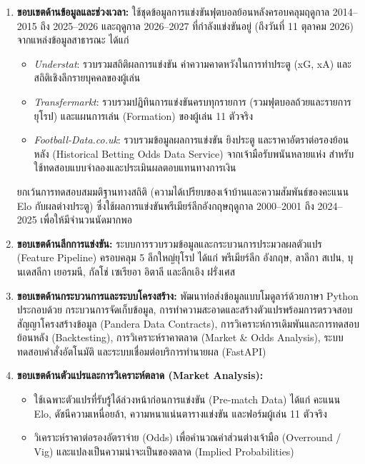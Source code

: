 \begin{enumerate}[label=\arabic*)]
    \item \textbf{ขอบเขตด้านข้อมูลและช่วงเวลา:} ใช้ชุดข้อมูลการแข่งขันฟุตบอลย้อนหลังครอบคลุมฤดูกาล 2014--2015 ถึง 2025--2026 และฤดูกาล 2026--2027 ที่กำลังแข่งขันอยู่ (ถึงวันที่ 11 ตุลาคม 2026) จากแหล่งข้อมูลสาธารณะ ได้แก่
    \begin{itemize}[labelindent=0pt]
        \item \textit{Understat}: รวบรวมสถิติผลการแข่งขัน ค่าความคาดหวังในการทำประตู (xG, xA) และสถิติเชิงลึกรายบุคคลของผู้เล่น \cite{understat2024}
        \item \textit{Transfermarkt}: รวบรวมปฏิทินการแข่งขันครบทุกรายการ (รวมฟุตบอลถ้วยและรายการยุโรป) และแผนการเล่น (Formation) ของผู้เล่น 11 ตัวจริง \cite{transfermarkt2024}
        \item \textit{Football-Data.co.uk}: รวบรวมข้อมูลผลการแข่งขัน ยิงประตู และราคาอัตราต่อรองย้อนหลัง (Historical Betting Odds Data Service) จากเจ้ามือรับพนันหลายแห่ง สำหรับใช้ทดสอบแบบจำลองและประเมินผลตอบแทนทางการเงิน
    \end{itemize}
    ยกเว้นการทดสอบสมมติฐานทางสถิติ (ความได้เปรียบของเจ้าบ้านและความสัมพันธ์ของคะแนน Elo กับผลต่างประตู) ซึ่งใช้ผลการแข่งขันพรีเมียร์ลีกอังกฤษฤดูกาล 2000--2001 ถึง 2024--2025 เพื่อให้มีจำนวนนัดมากพอ

    \item \textbf{ขอบเขตด้านลีกการแข่งขัน:} ระบบการรวบรวมข้อมูลและกระบวนการประมวลผลตัวแปร (Feature Pipeline) ครอบคลุม 5 ลีกใหญ่ยุโรป ได้แก่ พรีเมียร์ลีก อังกฤษ, ลาลีกา สเปน, บุนเดสลีกา เยอรมนี, กัลโช่ เซเรียอา อิตาลี และลีกเอิง ฝรั่งเศส

    \item \textbf{ขอบเขตด้านกระบวนการและระบบโครงสร้าง:} พัฒนาท่อส่งข้อมูลแบบโมดูลาร์ด้วยภาษา Python ประกอบด้วย กระบวนการจัดเก็บข้อมูล, การทำความสะอาดและสร้างตัวแปรพร้อมการตรวจสอบสัญญาโครงสร้างข้อมูล (Pandera Data Contracts), การวิเคราะห์การเดิมพันและการทดสอบย้อนหลัง (Backtesting), การวิเคราะห์ราคาตลาด (Market \& Odds Analysis), ระบบทดสอบคำสั่งอัตโนมัติ และระบบเชื่อมต่อบริการทำนายผล (FastAPI)

    \item \textbf{ขอบเขตด้านตัวแปรและการวิเคราะห์ตลาด (Market Analysis):}
    \begin{itemize}[labelindent=0pt]
        \item ใช้เฉพาะตัวแปรที่รับรู้ได้ล่วงหน้าก่อนการแข่งขัน (Pre-match Data) ได้แก่ คะแนน Elo, ดัชนีความเหนื่อยล้า, ความหนาแน่นตารางแข่งขัน และฟอร์มผู้เล่น 11 ตัวจริง
        \item วิเคราะห์ราคาต่อรองอัตราจ่าย (Odds) เพื่อคำนวณค่าส่วนต่างเจ้ามือ (Overround / Vig) และแปลงเป็นความน่าจะเป็นของตลาด (Implied Probabilities)
    \end{itemize}


\end{enumerate}

